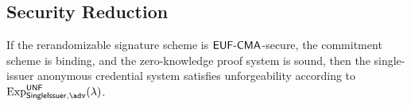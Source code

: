 \begin{pchstack}[boxed, center, space=1em]
\begin{pcvstack}
{        }
    \end{pcvstack}
\end{pchstack}











\subsection{Security Reduction}


\begin{theorem}
If the rerandomizable signature scheme is $\mathsf{EUF\text{-}CMA}$-secure, the commitment scheme is binding, and the zero-knowledge proof system is sound, then the single-issuer anonymous credential system satisfies unforgeability according to $\mathrm{Exp}^{\mathsf{UNF}}_{\mathsf{SingleIssuer}, \adv}(\lambda)$.
\end{theorem}

